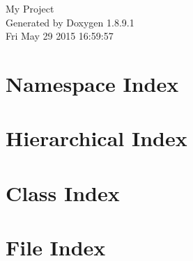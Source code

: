 \documentclass[twoside]{book}
\newcommand{\+}{\discretionary{\mbox{\scriptsize$\hookleftarrow$}}{}{}}
\newcommand{\clearemptydoublepage}{%
  \newpage{\pagestyle{empty}\cleardoublepage}%
}
\begin{document}
\hypersetup{pageanchor=false,
             bookmarks=true,
             bookmarksnumbered=true,
             pdfencoding=unicode
            }
\begin{titlepage}
\vspace*{7cm}
\begin{center}%
{\Large My Project }\\
\vspace*{1cm}
{\large Generated by Doxygen 1.8.9.1}\\
\vspace*{0.5cm}
{\small Fri May 29 2015 16:59:57}\\
\end{center}
\end{titlepage}
\clearemptydoublepage
\tableofcontents
\clearemptydoublepage
{}
\hypersetup{pageanchor=true}

\chapter{Namespace Index}

\chapter{Hierarchical Index}

\chapter{Class Index}

\chapter{File Index}

\end{document}
